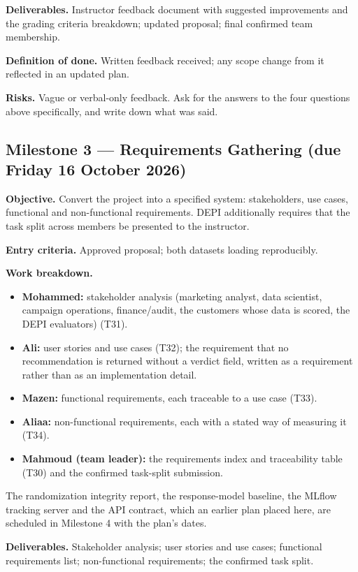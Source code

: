\documentclass[11pt,a4paper]{article}
\begin{document}
\textbf{Deliverables.} Instructor feedback document with suggested improvements and the grading
criteria breakdown; updated proposal; final confirmed team membership.

\textbf{Definition of done.} Written feedback received; any scope change from it reflected in an
updated plan.

\textbf{Risks.} Vague or verbal-only feedback. Ask for the answers to the four questions above
specifically, and write down what was said.

\subsection{Milestone 3 --- Requirements Gathering (due Friday 16 October 2026)}

\textbf{Objective.} Convert the project into a specified system: stakeholders, use cases,
functional and non-functional requirements. DEPI additionally requires that the task split across
members be presented to the instructor.

\textbf{Entry criteria.} Approved proposal; both datasets loading reproducibly.

\textbf{Work breakdown.}
\begin{itemize}
\item \textbf{Mohammed:} stakeholder analysis (marketing analyst, data scientist, campaign
operations, finance/audit, the customers whose data is scored, the DEPI evaluators) (T31).
\item \textbf{Ali:} user stories and use cases (T32); the requirement that no recommendation is
returned without a verdict field, written as a requirement rather than as an implementation detail.
\item \textbf{Mazen:} functional requirements, each traceable to a use case (T33).
\item \textbf{Aliaa:} non-functional requirements, each with a stated way of measuring it (T34).
\item \textbf{Mahmoud (team leader):} the requirements index and traceability table (T30) and the
confirmed task-split submission.
\end{itemize}

The randomization integrity report, the response-model baseline, the MLflow tracking server and the
API contract, which an earlier plan placed here, are scheduled in Milestone 4 with the plan's dates.

\textbf{Deliverables.} Stakeholder analysis; user stories and use cases; functional requirements
list; non-functional requirements; the confirmed task split.
\end{document}
